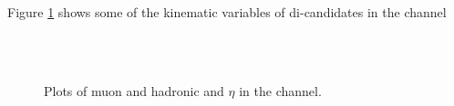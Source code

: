 Figure \ref{fig:Hhh_selection_kinematics_mt} shows some of the kinematic variables 
of di-\Pgt candidates in the \mutau channel
\begin{figure}[h!]
\begin{center}
  ~\\
  ~\\

\end{center}
\caption{Plots of muon and hadronic \Pgt \pT and $\eta$ in the \mutau channel.}
\label{fig:Hhh_selection_kinematics_mt}
\end{figure}


